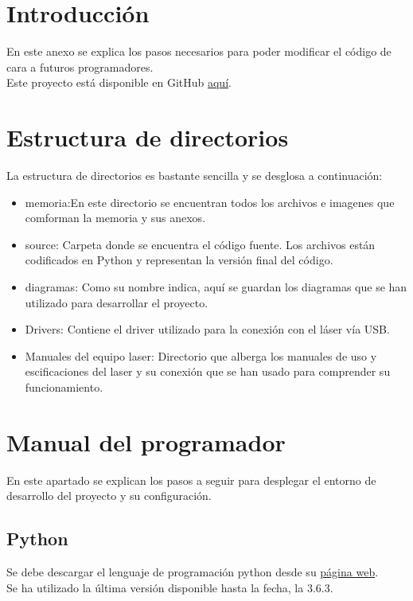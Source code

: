 
\section{Introducción}
En este anexo se explica los pasos necesarios para poder modificar el código de cara a futuros programadores.\\


Este proyecto está disponible en GitHub \href{https://github.com/mfe0007/TFG-Deteccion_de_pallets_mediante_LIDAR}{aquí}.\\

\section{Estructura de directorios}
La estructura de directorios es bastante sencilla y se desglosa a continuación:\\

\begin{itemize}
	\item memoria:En este directorio se encuentran todos los archivos e imagenes que comforman la memoria y sus anexos.
	\item source: Carpeta donde se encuentra el código fuente. Los archivos están codificados en Python y representan la versión final del código.
	\item diagramas: Como su nombre indica, aquí se guardan los diagramas que se han utilizado para desarrollar el proyecto.
	\item Drivers: Contiene el driver utilizado para la conexión con el láser vía USB.
	\item Manuales del equipo laser: Directorio que alberga los manuales de uso y escificaciones del laser y su conexión que se han usado para comprender su funcionamiento.
\end{itemize}



\section{Manual del programador}
En este apartado se explican los pasos a seguir para desplegar el entorno de desarrollo del proyecto y su configuración.

\subsection{Python}
Se debe descargar el lenguaje de programación python desde su \href{https://www.python.org/downloads/release/python-363/}{página web}.\\
Se ha utilizado la última versión disponible hasta la fecha, la 3.6.3.\\


